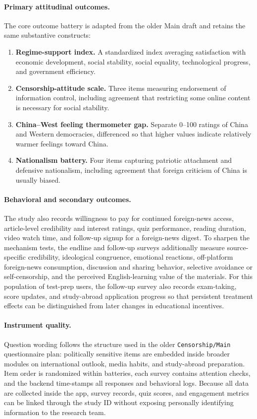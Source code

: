 \documentclass[12pt,american]{article}
\begin{document}
\paragraph{Primary attitudinal outcomes.}
The core outcome battery is adapted from the older Main draft and retains the same substantive constructs:
\begin{enumerate}[label=\arabic*., leftmargin=1.5em]
\item \textbf{Regime-support index.} A standardized index averaging satisfaction with economic development, social stability, social equality, technological progress, and government efficiency.
\item \textbf{Censorship-attitude scale.} Three items measuring endorsement of information control, including agreement that restricting some online content is necessary for social stability.
\item \textbf{China--West feeling thermometer gap.} Separate 0--100 ratings of China and Western democracies, differenced so that higher values indicate relatively warmer feelings toward China.
\item \textbf{Nationalism battery.} Four items capturing patriotic attachment and defensive nationalism, including agreement that foreign criticism of China is usually biased.
\end{enumerate}

\paragraph{Behavioral and secondary outcomes.}
The study also records willingness to pay for continued foreign-news access, article-level credibility and interest ratings, quiz performance, reading duration, video watch time, and follow-up signup for a foreign-news digest. To sharpen the mechanism tests, the endline and follow-up surveys additionally measure source-specific credibility, ideological congruence, emotional reactions, off-platform foreign-news consumption, discussion and sharing behavior, selective avoidance or self-censorship, and the perceived English-learning value of the materials. For this population of test-prep users, the follow-up survey also records exam-taking, score updates, and study-abroad application progress so that persistent treatment effects can be distinguished from later changes in educational incentives.

\paragraph{Instrument quality.}
Question wording follows the structure used in the older \texttt{Censorship/Main} questionnaire plan: politically sensitive items are embedded inside broader modules on international outlook, media habits, and study-abroad preparation. Item order is randomized within batteries, each survey contains attention checks, and the backend time-stamps all responses and behavioral logs. Because all data are collected inside the app, survey records, quiz scores, and engagement metrics can be linked through the study ID without exposing personally identifying information to the research team.
\end{document}
